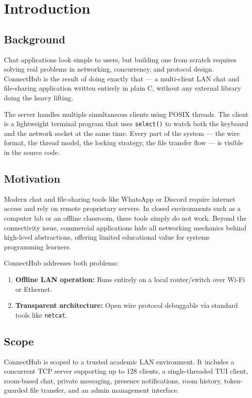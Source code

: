 \documentclass[12pt,a4paper]{report}
\begin{document}
\chapter{Introduction}
\section{Background}
Chat applications look simple to users, but building one from scratch requires solving real problems in networking, concurrency, and protocol design. ConnectHub is the result of doing exactly that — a multi-client LAN chat and file-sharing application written entirely in plain C, without any external library doing the heavy lifting.

The server handles multiple simultaneous clients using POSIX threads. The client is a lightweight terminal program that uses \texttt{select()} to watch both the keyboard and the network socket at the same time. Every part of the system — the wire format, the thread model, the locking strategy, the file transfer flow — is visible in the source code.

\section{Motivation}
Modern chat and file-sharing tools like WhatsApp or Discord require internet access and rely on remote proprietary servers. In closed environments such as a computer lab or an offline classroom, these tools simply do not work. Beyond the connectivity issue, commercial applications hide all networking mechanics behind high-level abstractions, offering limited educational value for systems programming learners.

ConnectHub addresses both problems:
\begin{enumerate}
    \item \textbf{Offline LAN operation:} Runs entirely on a local router/switch over Wi-Fi or Ethernet.
    \item \textbf{Transparent architecture:} Open wire protocol debuggable via standard tools like \texttt{netcat}.
\end{enumerate}

\section{Scope}
ConnectHub is scoped to a trusted academic LAN environment. It includes a concurrent TCP server supporting up to 128 clients, a single-threaded TUI client, room-based chat, private messaging, presence notifications, room history, token-guarded file transfer, and an admin management interface.
\end{document}

